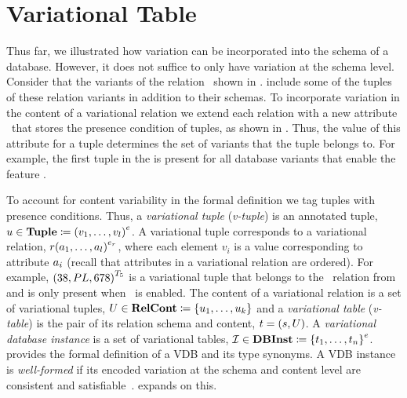 \section{Variational Table}
\label{sec:vtab}


Thus far, 
we illustrated how variation can be incorporated into the schema of a database.
However, it does not suffice to only have variation at the schema level. Consider that the 
variants of the relation \empbio\ shown in . 
include some of the tuples of these relation variants in addition to their schemas. 
To incorporate variation in the content of a variational relation we
extend each relation with a new attribute \pcatt\ that stores 
the presence condition of tuples, as shown in
. Thus,
the value of this attribute for a tuple determines the set of variants that the tuple
belongs to. For example, the first tuple in the  is present for
all database variants that enable the feature \vThree. 


To account 
for content variability in the formal definition we tag tuples with 
presence conditions. 
%
Thus, a \emph{variational tuple} (\emph{v-tuple}) is an annotated tuple,
$\vTuple\in\tupletype \eqq \annot[\dimMeta]{(\vi v \numAtts)}$. A
variational tuple corresponds to a variational relation,
$\vRel\annot[\dimMeta_\vRel]{(\vi \vAtt \numAtts)}$,
where each element $v_i$ is a value corresponding to attribute $\vAtt_i$
(recall that attributes in a variational relation are ordered).
%
For example, $\annot[\tFive]{(38, PL, 678)}$ is a variational tuple that belongs to the
\ecourse\ relation from  and is only present when \tFive\ is
enabled. 
%
The content of a variational relation
is a set of variational tuples,
$\vRelCont \in \vRelContSet \eqq \setDef {\vi \vTuple \numTuples}$
and 
%
a \emph{variational table} (\emph{v-table}) is the pair of its relation
schema and content, $\vTab = (\vRelSch, \vRelCont)$.
%
A \emph{variational database instance}
is a set of variational tables,
$\synDef \vdbInst  \vdbInstSet \eqq \annot [\dimMeta] {\setDef {\vi \vTab \numRels} }$.
%
 provides the formal definition of a VDB and its type synonyms.
A VDB instance is \emph{well-formed} if its encoded variation at
the schema and content level are consistent and satisfiable~\cite{ALW21vamos}.
 expands on this. 

